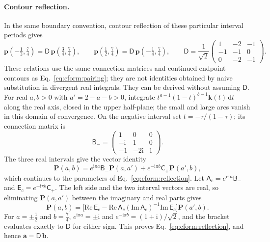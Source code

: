 \documentclass[11pt,a4paper]{article}
\numberwithin{equation}{section}
\newcommand{\dd}{\,\mathrm d}
\begin{document}
\paragraph{Contour reflection.} In the same boundary convention, contour reflection of these particular interval
periods gives
\begin{equation}
 \mathbf p(-\tfrac12,\tfrac74)=\mathsf D\,\mathbf p(\tfrac34,\tfrac74),\qquad
 \mathbf p(\tfrac12,\tfrac74)=\mathsf D\,\mathbf p(-\tfrac14,\tfrac74),\qquad
 \mathsf D=\frac1{\sqrt2}\begin{pmatrix}1&-2&-1\\-1&-1&0\\0&-2&-1\end{pmatrix}.
 \label{eq:cform:reflection}
\end{equation}
These relations use the same connection matrices and continued endpoint contours as Eq.~\eqref{eq:cform:pairing};
they are not identities obtained by naive substitution in divergent real integrals. They can be derived without
assuming $\mathsf D$. For real $a,b>0$ with $a'=2-a-b>0$, integrate $t^{a-1}(1-t)^{b-1}\mathbf k(t)\dd t$ along the
real axis, closed in the upper half-plane; the small and large arcs vanish in this domain of convergence. On the
negative interval set $t=-\tau/(1-\tau)$; its connection matrix is
\begin{equation}
 \mathsf B_-=\begin{pmatrix}1&0&0\\-\mathrm i&1&0\\-1&-2\mathrm i&1\end{pmatrix}.
\end{equation}
The three real intervals give the vector identity
\begin{equation}
 \mathbf P(a,b)=e^{\mathrm i\pi a}\mathsf B_-\mathbf P(a,a')+e^{-\mathrm i\pi b}\mathsf C_+\mathbf P(a',b),
\end{equation}
which continues to the parameters of Eq.~\eqref{eq:cform:reflection}. Let $\mathsf A_c=e^{\mathrm i\pi a}\mathsf B_-$ and
$\mathsf E_c=e^{-\mathrm i\pi b}\mathsf C_+$. The left side and the two interval vectors are real, so eliminating
$\mathbf P(a,a')$ between the imaginary and real parts gives
\begin{equation}
 \mathbf P(a,b)=\bigl[\mathrm{Re}\,\mathsf E_c-\mathrm{Re}\,\mathsf A_c(\mathrm{Im}\,\mathsf A_c)^{-1}\mathrm{Im}\,\mathsf E_c\bigr]
 \mathbf P(a',b).
\end{equation}
For $a=\pm\frac12$ and $b=\frac74$, $e^{\mathrm i\pi a}=\pm\mathrm i$ and $e^{-\mathrm i\pi b}=(1+\mathrm i)/\sqrt2$, and the
bracket evaluates exactly to $\mathsf D$ for either sign. This proves Eq.~\eqref{eq:cform:reflection}, and hence
$\mathbf a=\mathsf D\,\mathbf b$.
\end{document}
